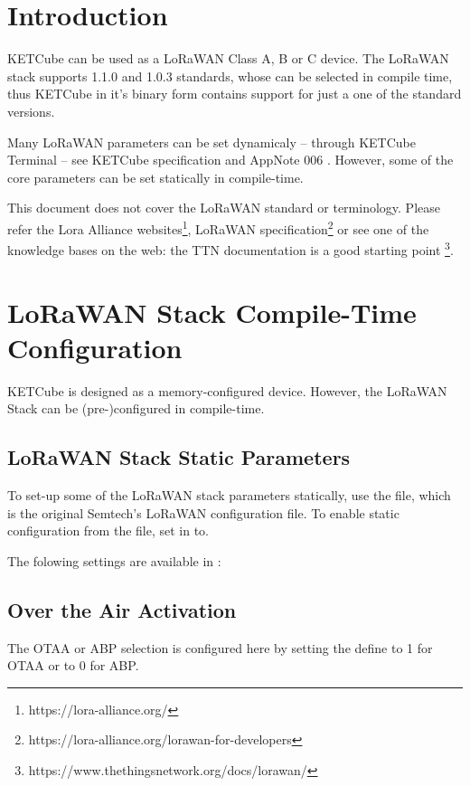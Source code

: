\clearpage 
{} 
\pagestyle{headings} 

\clearpage
\clearpage
\section{Introduction}
  KETCube can be used as a LoRaWAN Class A, B or C device. The LoRaWAN stack supports 1.1.0 and 1.0.3 standards, whose can be selected in compile time, thus KETCube in it's binary form contains support for just a one of the standard versions.
  
  Many LoRaWAN parameters can be set dynamicaly -- through KETCube Terminal -- see KETCube specification \cite{ZCU:KETCube:05-2018} and AppNote 006 \cite{ZCU:KETCubeAppNote006:09-2019}. However, some of the core parameters can be set statically in compile-time.

  This document does not cover the LoRaWAN standard or terminology. Please refer the Lora Alliance websites\footnote{https://lora-alliance.org/}, LoRaWAN specification\footnote{https://lora-alliance.org/lorawan-for-developers} or see one of the knowledge bases on the web: the TTN documentation is a good starting point \footnote{https://www.thethingsnetwork.org/docs/lorawan/}.
  
\clearpage


\section{LoRaWAN Stack Compile-Time Configuration}

KETCube is designed as a memory-configured device. However, the LoRaWAN Stack can be (pre-)configured in compile-time. 

\subsection{LoRaWAN Stack Static Parameters}
To set-up some of the LoRaWAN stack parameters statically, use the  file, which is the original Semtech's LoRaWAN configuration file. To enable static configuration from the  file, set  in  to\break {}.

The folowing settings are available in :

\subsection*{Over the Air Activation}
The OTAA or ABP selection is configured here by setting the \break{} define to 1 for OTAA or to 0 for ABP.

